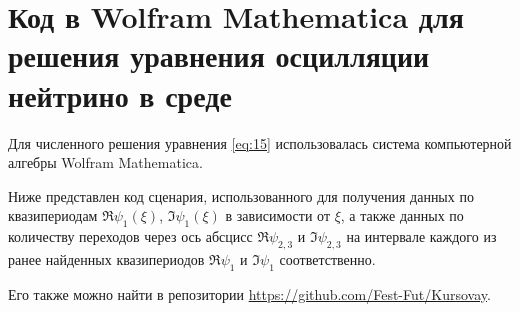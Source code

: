 \section{Код в Wolfram Mathematica для решения уравнения осцилляции нейтрино в среде}
\label{app: code-python-vis}

Для численного решения уравнения \eqref{eq:15} использовалась система компьютерной алгебры \textsf{Wolfram Mathematica}. 


Ниже представлен код сценария, использованного для получения данных по квазипериодам \(\Re \psi_1(\xi)\), \(\Im\psi_1(\xi)\) в зависимости от \(\xi\), а также данных по количеству переходов через ось абсцисс \(\Re\psi_{2, 3}\) и \(\Im\psi_{2, 3}\) на интервале каждого из ранее найденных квазипериодов \(\Re\psi_1\) и \(\Im\psi_1\) соответственно.

Его также можно найти в репозитории \url{https://github.com/Fest-Fut/Kursovay}.

\inputminted[linenos,breaklines,fontsize=\scriptsize]{Markdown}{Sun_DOPRI_p5.md}

